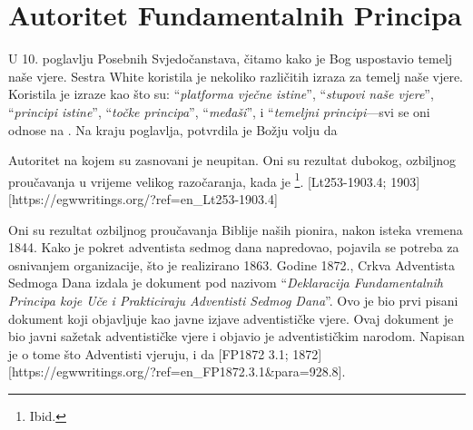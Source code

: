 \chapter{Autoritet Fundamentalnih Principa} \label{chap:authority}

U 10. poglavlju Posebnih Svjedočanstava, čitamo kako je Bog uspostavio temelj naše vjere. Sestra White koristila je nekoliko različitih izraza za temelj naše vjere. Koristila je izraze kao što su: “\textit{platforma vječne istine}”, “\textit{stupovi naše vjere}”, “\textit{principi istine}”, “\textit{točke principa}”, “\textit{međaši}”, i “\textit{temeljni principi}—svi se oni odnose na . Na kraju poglavlja, potvrdila je Božju volju da 

Autoritet na kojem su  zasnovani je neupitan. Oni su rezultat dubokog, ozbiljnog proučavanja u vrijeme velikog razočaranja, kada je \footnote{Ibid.}. [Lt253-1903.4; 1903][https://egwwritings.org/?ref=en\_Lt253-1903.4]

Oni su rezultat ozbiljnog proučavanja Biblije naših pionira, nakon isteka vremena 1844. Kako je pokret adventista sedmog dana napredovao, pojavila se potreba za osnivanjem organizacije, što je realizirano 1863. Godine 1872., Crkva Adventista Sedmoga Dana izdala je dokument pod nazivom “\textit{Deklaracija Fundamentalnih Principa koje Uče i Prakticiraju Adventisti Sedmog Dana}”. Ovo je bio prvi pisani dokument koji objavljuje  kao javne izjave adventističke vjere. Ovaj dokument je bio javni sažetak adventističke vjere i objavio je  adventističkim narodom. Napisan je  o tome što Adventisti vjeruju,  i da [FP1872 3.1; 1872][https://egwwritings.org/?ref=en\_FP1872.3.1&para=928.8].

